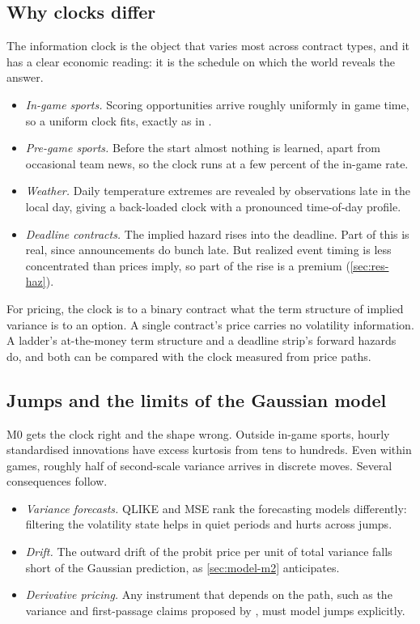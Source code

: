 \subsection{Why clocks differ}

The information clock is the object that varies most across contract types, and it has a clear
economic reading: it is the schedule on which the world reveals the answer.
\begin{itemize}
  \item \emph{In-game sports.} Scoring opportunities arrive roughly uniformly in game time, so a
  uniform clock fits, exactly as in \citet{stern1994}.
  \item \emph{Pre-game sports.} Before the start almost nothing is learned, apart from occasional
  team news, so the clock runs at a few percent of the in-game rate.
  \item \emph{Weather.} Daily temperature extremes are revealed by observations late in the local
  day, giving a back-loaded clock with a pronounced time-of-day profile.
  \item \emph{Deadline contracts.} The implied hazard rises into the deadline. Part of this is real,
  since announcements do bunch late. But realized event timing is less concentrated than prices
  imply, so part of the rise is a premium (\cref{sec:res-haz}).
\end{itemize}

For pricing, the clock is to a binary contract what the term structure of implied variance is to
an option. A single contract's price carries no volatility information. A ladder's at-the-money
term structure and a deadline strip's forward hazards do, and both can be compared with the clock
measured from price paths.

\subsection{Jumps and the limits of the Gaussian model}

M0 gets the clock right and the shape wrong. Outside in-game sports, hourly standardised
innovations have excess kurtosis from tens to hundreds. Even within games, roughly half of
second-scale variance arrives in discrete moves. Several consequences follow.
\begin{itemize}
  \item \emph{Variance forecasts.} QLIKE and MSE rank the forecasting models differently: filtering
  the volatility state helps in quiet periods and hurts across jumps.
  \item \emph{Drift.} The outward drift of the probit price per unit of total variance falls short
  of the Gaussian prediction, as \cref{sec:model-m2} anticipates.
  \item \emph{Derivative pricing.} Any instrument that depends on the path, such as the
  variance and first-passage claims proposed by \citet{dalen2025}, must model jumps explicitly.
\end{itemize}


